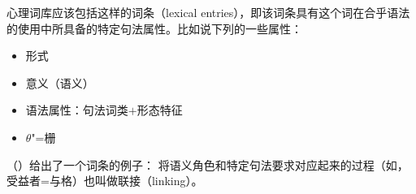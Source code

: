 心理词库应该包括这样的词条（lexical entries），即该词条具有这个词在合乎语法的使用中所具备的特定句法属性。比如说下列的一些属性：
\begin{itemize}
\item 形式
\item 意义（语义）
\item 语法属性：句法词类$+$形态特征  
\item $\theta$"=栅
\end{itemize}

\noindent
（）给出了一个词条的例子：
\ea
{}
\z
将语义角色和特定句法要求对应起来的过程（如，受益者=与格）也叫做联接（linking）。

